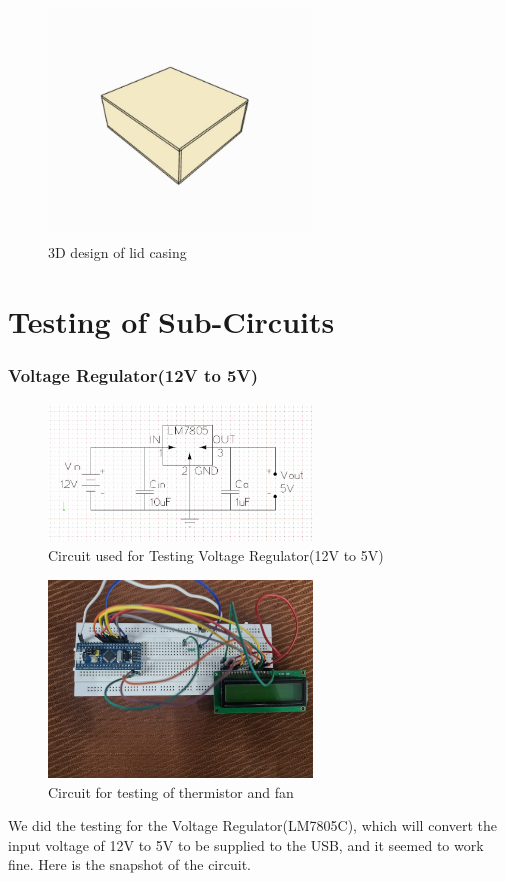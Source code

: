 \documentclass{article}
\begin{document}
\begin{figure}[h]
    \centering
    \includegraphics[width=7cm]{lid 3d.jpeg}
    \caption{3D design of lid casing}
    \label{fig:galaxy}
\end{figure}

\pagebreak

\maketitle
\section{Testing of Sub-Circuits}
\subsubsection{Voltage Regulator(12V to 5V)}

\begin{figure}[h]
    \centering
    \includegraphics[width=7cm]{lm7805.jpeg}
    \caption{Circuit used for Testing Voltage Regulator(12V to 5V)}
    \label{fig:galaxy}
\end{figure}

\begin{figure}[h]
    \centering
    \includegraphics[width=7cm]{WhatsApp Image 2023-03-27 at 4.47.49 AM.jpeg}
    \caption{Circuit for testing of thermistor and fan}
    \label{fig:galaxy}
\end{figure}
We did the testing for the Voltage Regulator(LM7805C), which will convert the input voltage of 12V to 5V to be supplied to the USB, and it seemed to work fine.
Here is the snapshot of the circuit.
\end{document}
